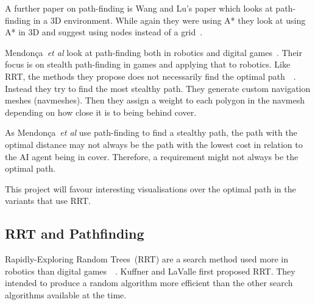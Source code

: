 \documentclass[journal]{IEEEtran}
\begin{document}
A further paper on path-finding is Wang and Lu's paper which looks at path-finding in a 3D environment. While again they were using A* they look at using A* in 3D and suggest using nodes instead of a grid~\cite{wang2012}.

Mendonça~\textit{et al} look at path-finding both in robotics and digital games~\cite{Mendonça2015}. Their focus is on stealth path-finding in games and applying that to robotics. Like RRT, the methods they propose does not necessarily find the optimal path~\cite{karaman2010}~\cite{Mendonça2015}. Instead they try to find the most stealthy path. They generate custom navigation meshes (navmeshes). Then they assign a weight to each polygon in the navmesh depending on how close it is to being behind cover. 

As Mendonça~\textit{et al} use path-finding to find a stealthy path, the path with the optimal distance may not always be the path with the lowest cost in relation to the AI agent being in cover. Therefore, a requirement might not always be the optimal path. 

This project will favour interesting visualisations over the optimal path in the variants that use RRT. 


\subsection{RRT and Pathfinding}
Rapidly-Exploring Random Trees~(RRT) are a search method used more in robotics than digital games~\cite{LaValle1998}~\cite{Kuffner2000}.   Kuffner and LaValle first proposed RRT. They intended to produce a random algorithm more efficient than the other search algorithms available at the time. 
\end{document}

